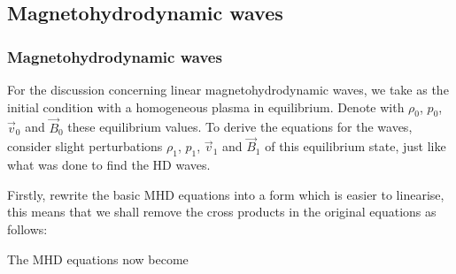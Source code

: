 
\subsection{Magnetohydrodynamic waves}
\label{sec:MHD-waves}

\subsubsection{Magnetohydrodynamic waves}

For the discussion concerning linear magnetohydrodynamic waves, we take as the initial condition with a homogeneous plasma in equilibrium.
Denote with $\rho_0$, $p_0$, $\vec{v}_0$ and $\vec{B}_0$ these equilibrium values. 
To derive the equations for the waves, consider slight perturbations $\rho_1$, $p_1$, $\vec{v}_1$ and $\vec{B}_1$ of this equilibrium state, just like what was done to find the HD waves.

Firstly, rewrite the basic MHD equations into a form which is easier to linearise,
this means that we shall remove the cross products in the original equations as follows:

{\centering 
{}
\par}


The MHD equations now become

{\centering 
\noindent {}
\par}

